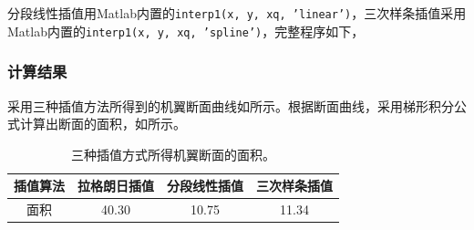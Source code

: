 \documentclass[12pt,a4paper]{article}
\begin{document}
分段线性插值用Matlab内置的\texttt{interp1(x, y, xq, 'linear')}，三次样条插值采用Matlab内置的\texttt{interp1(x, y, xq, 'spline')}，完整程序如下，


\subsubsection{计算结果}

采用三种插值方法所得到的机翼断面曲线如所示。根据断面曲线，采用梯形积分公式计算出断面的面积，如所示。

\begin{table}[h]
    \centering
    \caption{三种插值方式所得机翼断面的面积。}
    \label{tab:ex10_area}
    \begin{tabular}[]{c|ccc}
        \toprule
        插值算法 & 拉格朗日插值 & 分段线性插值 & 三次样条插值\tabularnewline
        \midrule
        面积 & 40.30 & 10.75 & 11.34\tabularnewline
        \bottomrule
    \end{tabular}
\end{table}
\end{document}
